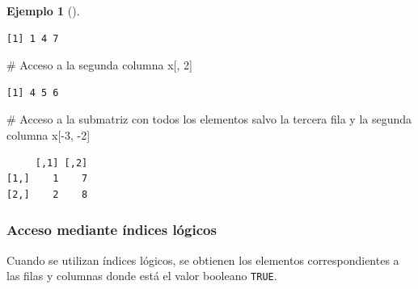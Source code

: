 \documentclass[
  a4paper,
]{scrreport}
\newenvironment{Shaded}{\begin{snugshade}}{\end{snugshade}}
\newcommand{\CommentTok}[1]{\textcolor[rgb]{0.37,0.37,0.37}{#1}}
\newcommand{\DecValTok}[1]{\textcolor[rgb]{0.68,0.00,0.00}{#1}}
\newcommand{\NormalTok}[1]{\textcolor[rgb]{0.00,0.23,0.31}{#1}}
\newcommand{\SpecialCharTok}[1]{\textcolor[rgb]{0.37,0.37,0.37}{#1}}
\theoremstyle{definition}
\theoremstyle{definition}
\newtheorem{example}{Ejemplo}[chapter]
\theoremstyle{remark}
\begin{document}
\begin{example}[]
\begin{verbatim}
[1] 1 4 7
\end{verbatim}

\begin{Shaded}
\begin{Highlighting}[]
\CommentTok{\# Acceso a la segunda columna}
\NormalTok{x[, }\DecValTok{2}\NormalTok{]}
\end{Highlighting}
\end{Shaded}

\begin{verbatim}
[1] 4 5 6
\end{verbatim}

\begin{Shaded}
\begin{Highlighting}[]
\CommentTok{\# Acceso a la submatriz con todos los elementos salvo la tercera fila y la segunda columna}
\NormalTok{x[}\SpecialCharTok{{-}}\DecValTok{3}\NormalTok{, }\SpecialCharTok{{-}}\DecValTok{2}\NormalTok{]}
\end{Highlighting}
\end{Shaded}

\begin{verbatim}
     [,1] [,2]
[1,]    1    7
[2,]    2    8
\end{verbatim}

\end{example}

\hypertarget{acceso-mediante-uxedndices-luxf3gicos}{%
\subsubsection{Acceso mediante índices
lógicos}\label{acceso-mediante-uxedndices-luxf3gicos}}

Cuando se utilizan índices lógicos, se obtienen los elementos
correspondientes a las filas y columnas donde está el valor booleano
\texttt{TRUE}.
\end{document}
